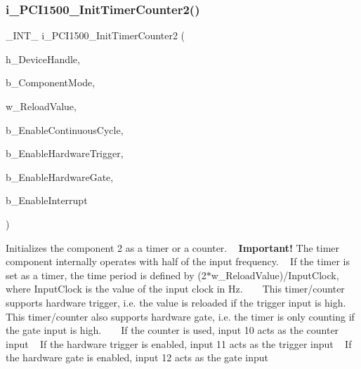 \subsubsection{\texorpdfstring{i\_PCI1500\_InitTimerCounter2()}{i\_PCI1500\_InitTimerCounter2()}}
{\footnotesize\ttfamily \+\_\+\+I\+N\+T\+\_\+ i\+\_\+\+P\+C\+I1500\+\_\+\+Init\+Timer\+Counter2 (\begin{DoxyParamCaption}\item[{H\+A\+N\+D\+LE}]{h\+\_\+\+Device\+Handle,  }\item[{B\+Y\+TE}]{b\+\_\+\+Component\+Mode,  }\item[{W\+O\+RD}]{w\+\_\+\+Reload\+Value,  }\item[{B\+Y\+TE}]{b\+\_\+\+Enable\+Continuous\+Cycle,  }\item[{B\+Y\+TE}]{b\+\_\+\+Enable\+Hardware\+Trigger,  }\item[{B\+Y\+TE}]{b\+\_\+\+Enable\+Hardware\+Gate,  }\item[{B\+Y\+TE}]{b\+\_\+\+Enable\+Interrupt }\end{DoxyParamCaption})}

Initializes the component 2 as a timer or a counter. ~\newline
 {\bfseries{Important!}} The timer component internally operates with half of the input frequency. ~\newline
 If the timer is set as a timer, the time period is defined by (2$\ast$w\+\_\+\+Reload\+Value)/\+Input\+Clock, where Input\+Clock is the value of the input clock in Hz. ~\newline
 ~\newline
 This timer/counter supports hardware trigger, i.\+e. the value is reloaded if the trigger input is high. ~\newline
 This timer/counter also supports hardware gate, i.\+e. the timer is only counting if the gate input is high. ~\newline
 ~\newline
 If the counter is used, input 10 acts as the counter input ~\newline
 If the hardware trigger is enabled, input 11 acts as the trigger input ~\newline
 If the hardware gate is enabled, input 12 acts as the gate input ~\newline
 
